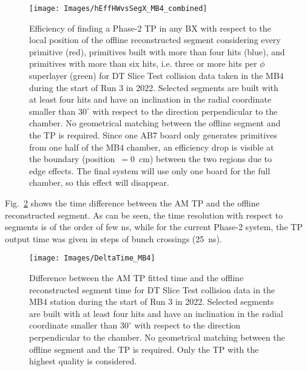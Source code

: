 \documentclass[../main.tex]{subfiles}
\begin{document}
\begin{figure}[h!]
\begin{center}
\texttt{[image: Images/hEffHWvsSegX\_MB4\_combined]}
\end{center}
\caption{Efficiency of finding a Phase-2 TP in any BX with respect to the local position of the offline reconstructed segment considering every primitive (red), primitives built with more than four hits (blue), and primitives with more than six hits, i.e. three or more hits per $\phi$ superlayer (green) for DT Slice Test collision data taken in the MB4 during the start of Run 3 in 2022. Selected segments are built with at least four hits and have an inclination in the radial coordinate smaller than $30^\circ$ with respect to the direction perpendicular to the chamber. No geometrical matching between the offline segment and the TP is required. Since one AB7 board only generates primitives from one half of the MB4 chamber, an efficiency drop is visible at the boundary (position~$=0$~cm) between the two regions due to edge effects. The final system will use only one board for the full chamber, so this effect will disappear.}
\label{dts:fig:st_eff}
\end{figure}


Fig.~\ref{dts:fig:st_time} shows the time difference between the AM TP and the offline reconstructed segment. As can be seen, the time resolution with respect to segments is of the order of few ns, while for the current Phase-2 system, the TP output time was given in steps of bunch crossings (25~ns).

\begin{figure}[h!]
\begin{center}
\texttt{[image: Images/DeltaTime\_MB4]}
\end{center}
\caption{Difference between the AM TP fitted time and the offline reconstructed segment time for DT Slice Test collision data in the MB4 station during the start of Run 3 in 2022. Selected segments are built with at least four hits and have an inclination in the radial coordinate smaller than $30^\circ$ with respect to the direction perpendicular to the chamber. No geometrical matching between the offline segment and the TP is required. Only the TP with the highest quality is considered.}
\label{dts:fig:st_time}
\end{figure}





%
%
\end{document}
